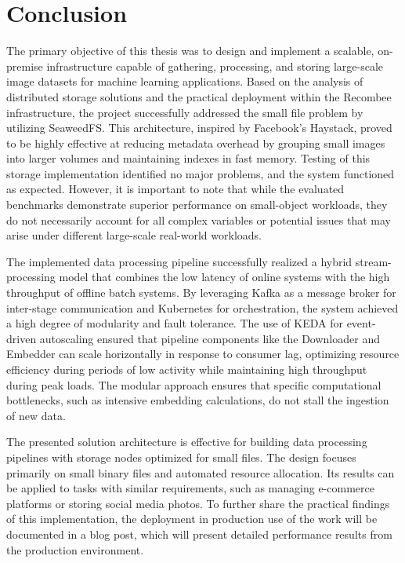 \chapter{Conclusion}
The primary objective of this thesis was to design and implement a scalable, on-premise infrastructure capable of gathering, processing, and storing large-scale image datasets for machine learning applications. Based on the analysis of distributed storage solutions and the practical deployment within the Recombee infrastructure, the project successfully addressed the small file problem by utilizing SeaweedFS. This architecture, inspired by Facebook’s Haystack, proved to be highly effective at reducing metadata overhead by grouping small images into larger volumes and maintaining indexes in fast memory. Testing of this storage implementation identified no major problems, and the system functioned as expected. However, it is important to note that while the evaluated benchmarks demonstrate superior performance on small-object workloads, they do not necessarily account for all complex variables or potential issues that may arise under different large-scale real-world workloads.

The implemented data processing pipeline successfully realized a hybrid stream-processing model that combines the low latency of online systems with the high throughput of offline batch systems. By leveraging Kafka as a message broker for inter-stage communication and Kubernetes for orchestration, the system achieved a high degree of modularity and fault tolerance. The use of KEDA for event-driven autoscaling ensured that pipeline components like the Downloader and Embedder can scale horizontally in response to consumer lag, optimizing resource efficiency during periods of low activity while maintaining high throughput during peak loads. The modular approach ensures that specific computational bottlenecks, such as intensive embedding calculations, do not stall the ingestion of new data.

The presented solution architecture is effective for building data processing pipelines with storage nodes optimized for small files. The design focuses primarily on small binary files and automated resource allocation. Its results can be applied to tasks with similar requirements, such as managing e-commerce platforms or storing social media photos. To further share the practical findings of this implementation, the deployment in production use of the work will be documented in a blog post, which will present detailed performance results from the production environment.